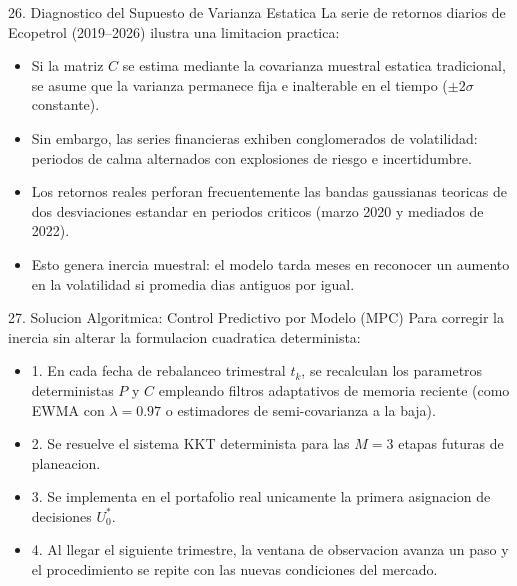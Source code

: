 \documentclass[aspectratio=169,10pt]{beamer}
\begin{document}
\begin{frame}{26. Diagnostico del Supuesto de Varianza Estatica}
  La serie de retornos diarios de Ecopetrol (2019--2026) ilustra una limitacion practica:
  \vspace{0.3cm}
  \begin{itemize}
    \item Si la matriz $C$ se estima mediante la covarianza muestral estatica tradicional, se asume que la varianza permanece fija e inalterable en el tiempo ($\pm 2\sigma$ constante).
    \vspace{0.2cm}
    \item Sin embargo, las series financieras exhiben conglomerados de volatilidad: periodos de calma alternados con explosiones de riesgo e incertidumbre.
    \vspace{0.2cm}
    \item Los retornos reales perforan frecuentemente las bandas gaussianas teoricas de dos desviaciones estandar en periodos criticos (marzo 2020 y mediados de 2022).
    \vspace{0.2cm}
    \item Esto genera inercia muestral: el modelo tarda meses en reconocer un aumento en la volatilidad si promedia dias antiguos por igual.
  \end{itemize}
\end{frame}

\begin{frame}{27. Solucion Algoritmica: Control Predictivo por Modelo (MPC)}
  Para corregir la inercia sin alterar la formulacion cuadratica determinista:
  \vspace{0.3cm}
  \begin{itemize}
    \item 1. En cada fecha de rebalanceo trimestral $t_k$, se recalculan los parametros deterministas $P$ y $C$ empleando filtros adaptativos de memoria reciente (como EWMA con $\lambda=0.97$ o estimadores de semi-covarianza a la baja).
    \vspace{0.2cm}
    \item 2. Se resuelve el sistema KKT determinista para las $M=3$ etapas futuras de planeacion.
    \vspace{0.2cm}
    \item 3. Se implementa en el portafolio real unicamente la primera asignacion de decisiones $U_0^*$.
    \vspace{0.2cm}
    \item 4. Al llegar el siguiente trimestre, la ventana de observacion avanza un paso y el procedimiento se repite con las nuevas condiciones del mercado.
  \end{itemize}
\end{frame}
\end{document}
